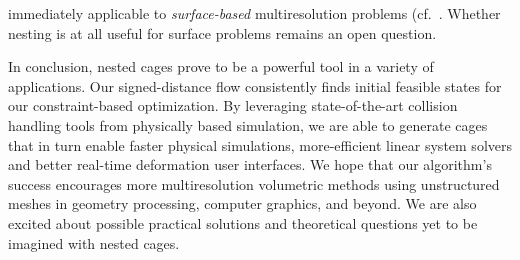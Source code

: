  immediately applicable to \emph{surface-based} multiresolution problems
(cf.\ \cite{Aksoylu2005msu,Chuang:2009:ELO}. Whether nesting is at all useful
for surface problems remains an open question.

In conclusion, nested cages prove to be a powerful tool in a variety of
applications. 
%
Our signed-distance flow consistently finds initial feasible states for our
constraint-based optimization.
%
By leveraging state-of-the-art collision handling tools from physically based
simulation, we are able to generate cages that in turn enable faster physical
simulations, more-efficient linear system solvers and better real-time
deformation user interfaces.
%
We hope that our algorithm's success encourages more multiresolution volumetric
methods using unstructured meshes in geometry processing, computer graphics,
and beyond.
%
We are also excited about possible practical solutions and theoretical
questions yet to be imagined with nested cages.

